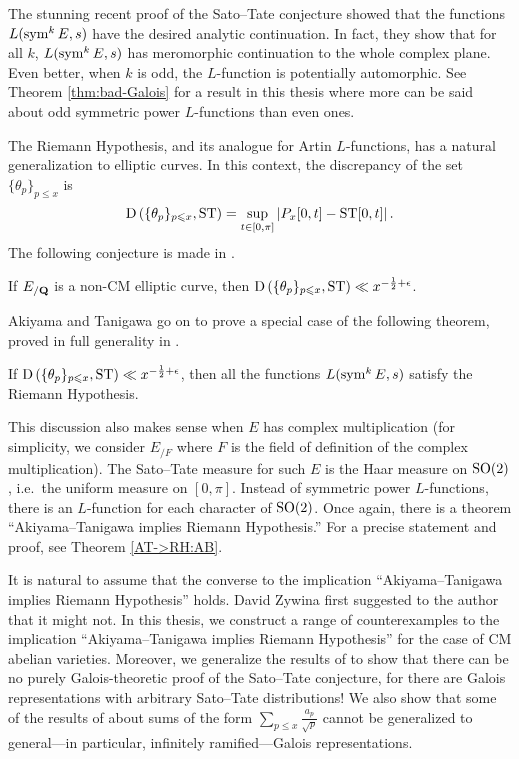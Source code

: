 The stunning recent proof of the Sato--Tate conjecture 
\cite{clozel-harris-taylor-2008,taylor-2008,harris-shepherd-barron-taylor-2010} 
showed that the functions $L(\operatorname{sym}^k E,s)$ have the desired analytic 
continuation. In fact, they show that for all $k$, $L(\operatorname{sym}^k E,s)$ has 
meromorphic continuation to the whole complex plane. Even better, when $k$ is 
odd, the $L$-function is potentially automorphic. See Theorem 
\ref{thm:bad-Galois} for a result in this thesis where more can be said about 
odd symmetric power $L$-functions than even ones. 

The Riemann Hypothesis, and its analogue for Artin $L$-functions, has a natural 
generalization to elliptic curves. In this context, the discrepancy of the set 
$\{\theta_p\}_{p\leqslant x}$ is 
\[
	\operatorname{D}\left(\{\theta_p\}_{p\leqslant x},\mathrm{ST}\right) = \sup_{t\in [0,\pi]} \left| P_x[0,t] - \mathrm{ST}[0,t]\right| .
\]
The following conjecture is made in \cite{akiyama-tanigawa-1999}.

\begin{conjecture}
If $E_{/\mathbf{Q}}$ is a non-CM elliptic curve, then 
$\operatorname{D}\left(\{\theta_p\}_{p\leqslant x},\mathrm{ST}\right)\ll x^{-\frac 1 2+\epsilon}$.
\end{conjecture}

Akiyama and Tanigawa go on to prove a special case of the following theorem, 
proved in full generality in \cite{mazur-2008}. 

\begin{theorem}[Mazur]
If $\operatorname{D}\left(\{\theta_p\}_{p\leqslant x},\mathrm{ST}\right)\ll x^{-\frac 1 2+\epsilon}$, 
then all the functions $L(\operatorname{sym}^k E, s)$ satisfy the Riemann Hypothesis. 
\end{theorem}

This discussion also makes sense when $E$ has complex multiplication (for 
simplicity, we consider $E_{/F}$ where $F$ is the field of definition of the 
complex multiplication). The Sato--Tate measure for such $E$ is the Haar 
measure on $\operatorname{SO}(2)$, i.e.~the uniform measure on $[0,\pi]$. Instead of 
symmetric power $L$-functions, there is an $L$-function for each character of 
$\operatorname{SO}(2)$. Once again, there is a theorem ``Akiyama--Tanigawa implies Riemann 
Hypothesis.'' For a precise statement and proof, see Theorem \ref{AT->RH:AB}. 

It is natural to assume that the converse to the implication 
``Akiyama--Tanigawa implies Riemann Hypothesis'' holds. David Zywina 
first suggested to the author that it might not. In this thesis, we construct a 
range of counterexamples to the implication ``Akiyama--Tanigawa implies 
Riemann Hypothesis'' for the case of CM abelian varieties. Moreover, we 
generalize the results of \cite{pande-2011} to show that there can be no 
purely Galois-theoretic proof of the Sato--Tate conjecture, for there are 
Galois representations with arbitrary Sato--Tate distributions! We also show 
that some of the results of \cite{sarnak-2007} about sums of the form 
$\sum_{p\leqslant x} \frac{a_p}{\sqrt p}$ cannot be generalized to 
general---in particular, infinitely ramified---Galois representations. 





